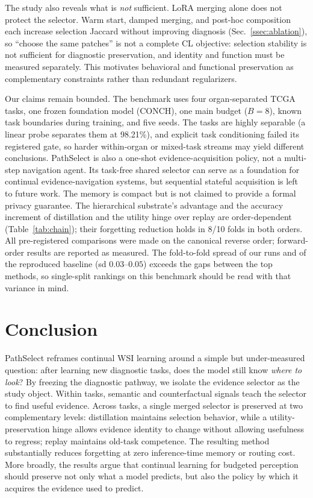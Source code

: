 \documentclass{article}
\begin{document}
The study also reveals what is \emph{not} sufficient.
LoRA merging alone does not protect the selector.
Warm start, damped merging, and post-hoc composition each increase selection Jaccard without improving diagnosis (Sec.~\ref{ssec:ablation}), so ``choose the same patches'' is not a complete CL objective: selection stability is not sufficient for diagnostic preservation, and identity and function must be measured separately.
This motivates behavioral and functional preservation as complementary constraints rather than redundant regularizers.

Our claims remain bounded.
The benchmark uses four organ-separated TCGA tasks, one frozen foundation model (CONCH), one main budget ($B=8$), known task boundaries during training, and five seeds.
The tasks are highly separable (a linear probe separates them at 98.21\%), and explicit task conditioning failed its registered gate, so harder within-organ or mixed-task streams may yield different conclusions.
PathSelect is also a one-shot evidence-acquisition policy, not a multi-step navigation agent.
Its task-free shared selector can serve as a foundation for continual evidence-navigation systems, but sequential stateful acquisition is left to future work. The memory is compact but is not claimed to provide a formal privacy guarantee. The hierarchical substrate's advantage and the accuracy increment of distillation and the utility hinge over replay are order-dependent (Table~\ref{tab:chain}); their forgetting reduction holds in 8/10 folds in both orders. All pre-registered comparisons were made on the canonical reverse order; forward-order results are reported as measured. The fold-to-fold spread of our runs and of the reproduced baseline (sd $0.03$--$0.05$) exceeds the gaps between the top methods, so single-split rankings on this benchmark should be read with that variance in mind.

\section{Conclusion}

PathSelect reframes continual WSI learning around a simple but under-measured question: after learning new diagnostic tasks, does the model still know \emph{where to look}?
By freezing the diagnostic pathway, we isolate the evidence selector as the study object.
Within tasks, semantic and counterfactual signals teach the selector to find useful evidence.
Across tasks, a single merged selector is preserved at two complementary levels: distillation maintains selection behavior, while a utility-preservation hinge allows evidence identity to change without allowing usefulness to regress; replay maintains old-task competence.
The resulting method substantially reduces forgetting at zero inference-time memory or routing cost.
More broadly, the results argue that continual learning for budgeted perception should preserve not only what a model predicts, but also the policy by which it acquires the evidence used to predict.



\end{document}
